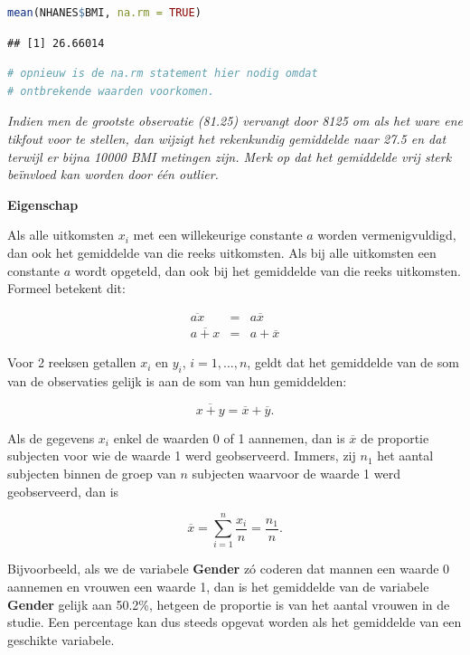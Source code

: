 \documentclass[
  12pt,dutch,coursenotes]{book}
\begin{document}
\begin{lstlisting}[language=R]
mean(NHANES$BMI, na.rm = TRUE)
\end{lstlisting}

\begin{lstlisting}
## [1] 26.66014
\end{lstlisting}

\begin{lstlisting}[language=R]
# opnieuw is de na.rm statement hier nodig omdat
# ontbrekende waarden voorkomen.
\end{lstlisting}

\emph{Indien men de grootste observatie (81.25) vervangt door 8125 om als het ware ene tikfout voor te stellen, dan wijzigt het rekenkundig gemiddelde naar 27.5 en dat terwijl er bijna 10000 BMI metingen zijn. Merk op dat het gemiddelde vrij sterk beïnvloed kan worden door één outlier.}

\textbf{Eigenschap}

Als alle uitkomsten \(x_i\) met een willekeurige constante \(a\)
worden vermenigvuldigd, dan ook het gemiddelde van die reeks uitkomsten. Als
bij alle uitkomsten een constante \(a\) wordt opgeteld, dan ook bij het
gemiddelde van die reeks uitkomsten. Formeel betekent dit:

\begin{eqnarray*}
\overline{ax} &= &a \overline{x} \\
\overline{a + x} &= &a + \overline{x}
\end{eqnarray*}

Voor 2 reeksen getallen \(x_i\) en \(y_i\), \(i=1,...,n\), geldt dat het
gemiddelde van de som van de observaties gelijk is aan de som van hun
gemiddelden:

\begin{equation*}
\overline{x + y} = \overline{x} + \overline{y}.
\end{equation*}

Als de gegevens \(x_i\) enkel de waarden 0 of 1 aannemen, dan is \(\overline{x}\)
de proportie subjecten voor wie de waarde 1 werd geobserveerd. Immers, zij \(n_1\) het aantal subjecten binnen de groep van \(n\) subjecten waarvoor de
waarde 1 werd geobserveerd, dan is

\begin{equation*}
\overline{x}= \sum_{i=1}^n \frac{x_i}{n} = \frac{n_1}{n}.
\end{equation*}

Bijvoorbeeld, als we de variabele \textbf{Gender} zó
coderen dat mannen een waarde 0 aannemen en vrouwen een waarde 1, dan is het
gemiddelde van de variabele \textbf{Gender} gelijk aan 50.2\%, hetgeen de proportie is van het aantal vrouwen in de studie. Een percentage kan dus
steeds opgevat worden als het gemiddelde van een geschikte variabele.
\end{document}
